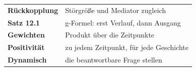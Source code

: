 \begin{merksatz}
\begin{center}
\renewcommand{\arraystretch}{1.5}
\begin{tabular}{@{}P{3.0cm}P{5.6cm}@{}}
\toprule
\textbf{Rückkopplung} & Störgröße und Mediator zugleich\\
\textbf{Satz 12.1} & g-Formel: erst Verlauf, dann Ausgang\\
\textbf{Gewichten} & Produkt über die Zeitpunkte\\
\textbf{Positivität} & zu jedem Zeitpunkt, für jede Geschichte\\
\textbf{Dynamisch} & die beantwortbare Frage stellen\\
\bottomrule
\end{tabular}
\end{center}

\begin{center}
\begin{minipage}{0.88\textwidth}
\end{minipage}
\end{center}
\end{merksatz}
